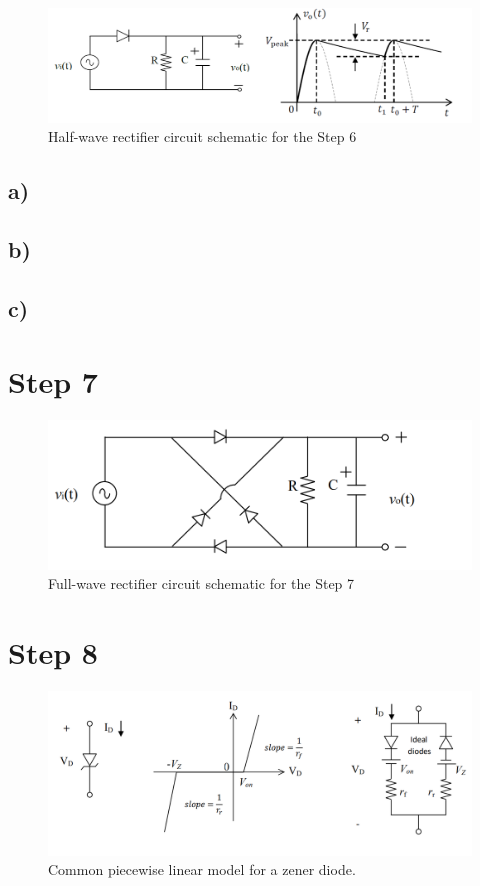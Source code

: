 \documentclass[letterpaper,12pt]{article}
\begin{document}
\begin{figure}[H]
    \centering
   \includegraphics[width=1\textwidth]{6_1.png}
   \caption{Half-wave rectifier circuit schematic for the Step 6}
\end{figure} 

\subsection{a)}
\subsection{b)}
\subsection{c)}
\section{Step 7}

\begin{figure}[H]
    \centering
   \includegraphics[width=1\textwidth]{7_1.png}
   \caption{Full-wave rectifier circuit schematic for the Step 7}
\end{figure} 

\section{Step 8}

\begin{figure}[H]
    \centering
   \includegraphics[width=1\textwidth]{8_1.png}
   \caption{Common piecewise linear model for a zener diode.}
\end{figure} 
\end{document}
